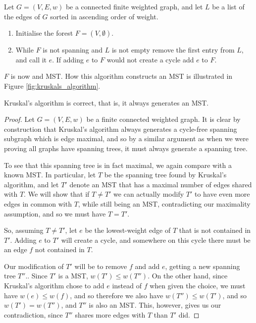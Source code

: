 \documentclass[nobib]{tufte-handout}
\begin{document}
\begin{definition}
  Let $G = (V,E,w)$ be a connected finite weighted graph, and let $L$ be a list of the edges of $G$ sorted in ascending order of weight.
  \begin{enumerate}
      \item Initialise the forest $F = (V, \emptyset)$. 
      \item While $F$ is not spanning and $L$ is not empty remove the first entry from $L$, and call it $e$. If adding $e$ to $F$ would not create a cycle add $e$ to $F$.
    \end{enumerate}
  $F$ is now and MST. How this algorithm constructs an MST is illustrated in Figure \ref{fig:kruskals_algorithm}.
\end{definition}

\begin{theorem}
  Kruskal's algorithm is correct, that is, it always generates an MST.

  \begin{proof}
    Let $G = (V,E,w)$ be a finite connected weighted graph. It is clear by construction that Kruskal's algorithm always generates a cycle-free spanning subgraph which is edge maximal, and so by a similar argument as when we were proving all graphs have spanning trees, it must always generate a spanning tree.

    To see that this spanning tree is in fact maximal, we again compare with a known MST. In particular, let $T$ be the spanning tree found by Kruskal's algorithm, and let $T'$ denote an MST that has a maximal number of edges shared with $T$. We will show that if $T \neq T'$ we can actually modify $T'$ to have even more edges in common with $T$, while still being an MST, contradicting our maximality assumption, and so we must have $T = T'$.

    So, assuming $T \neq T'$, let $e$ be the lowest-weight edge of $T$ that is not contained in $T'$. Adding $e$ to $T'$ will create a cycle, and somewhere on this cycle there must be an edge $f$ not contained in $T$.

    Our modification of $T'$ will be to remove $f$ and add $e$, getting a new spanning tree $T''$.. Since $T'$ is a MST, $w(T') \leq w(T'')$. On the other hand, since Kruskal's algorithm chose to add $e$ instead of $f$ when given the choice, we must have $w(e) \leq w(f)$, and so therefore we also have $w(T'') \leq w(T')$, and so $w(T') = w(T'')$, and $T''$ is also an MST. This, however, gives us our contradiction, since $T''$ shares more edges with $T$ than $T'$ did.
  \end{proof}
\end{theorem}
\end{document}
